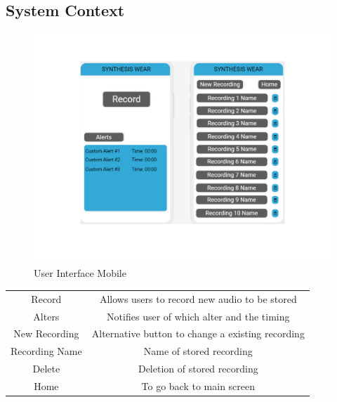 \documentclass[12pt, titlepage]{article}
\begin{document}
\subsection {System Context}
\begin{figure}[H]
  \includegraphics[clip,trim= 0cm 5cm 0cm 2cm,width=\textwidth,height=\textheight,keepaspectratio]{UserInterface.pdf}
  \caption{User Interface Mobile}
  \label{User Interface} 
\end{figure}
\begin{center}
\begin{tabular}{c c}
Record & Allows users to record new audio to be stored \\
Alters & Notifies user of which alter and the timing \\
New Recording & Alternative button to change a existing recording \\
Recording Name & Name of stored recording \\
Delete & Deletion of stored recording \\
Home & To go back to main screen \\
\end{tabular}
\end{center}
\end{document}

